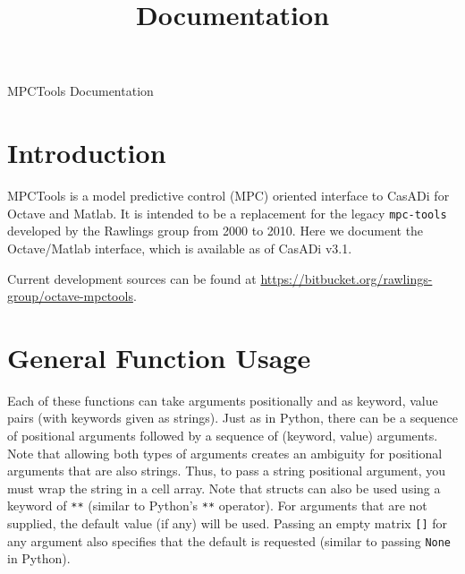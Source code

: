 \documentclass{article}
\title{\mpctools{} Documentation}
\newcommand{\casadi}{CasADi}
\newcommand{\mpctools}{MPCTools}
\newcommand{\octave}{Octave/Matlab}
\newcommand{\bitbucketlink}{\url{https://bitbucket.org/rawlings-group/octave-mpctools}}
\begin{document}
\begin{center}
    \LARGE \mpctools{} Documentation
\end{center}

\section{Introduction}

\mpctools{} is a model predictive control (MPC) oriented interface to \casadi{} for Octave and Matlab.
It is intended to be a replacement for the legacy \texttt{mpc-tools} developed by the Rawlings group from 2000 to 2010.
Here we document the \octave{} interface, which is available as of \casadi{} v3.1.

Current development sources can be found at \bitbucketlink{}.

\section{General Function Usage}

Each of these functions can take arguments positionally and as keyword, value pairs (with keywords given as strings).
Just as in Python, there can be a sequence of positional arguments followed by a sequence of (keyword, value) arguments.
Note that allowing both types of arguments creates an ambiguity for positional arguments that are also strings.
Thus, to pass a string positional argument, you must wrap the string in a cell array.
Note that structs can also be used using a keyword of \texttt{**} (similar to Python's \texttt{**} operator).
For arguments that are not supplied, the default value (if any) will be used.
Passing an empty matrix \texttt{[]} for any argument also specifies that the default is requested (similar to passing \texttt{None} in Python).
\end{document}
